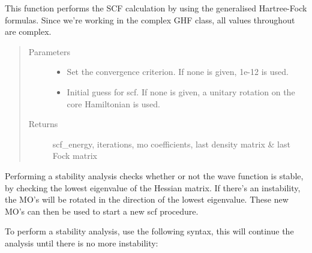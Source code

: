 \documentclass[letterpaper,10pt,english]{sphinxmanual}
\begin{document}
\begin{fulllineitems}
\begin{fulllineitems}
\label{\detokenize{Complex_GHF:ghf.complex_GHF.ComplexGHF.scf}}
This function performs the SCF calculation by using the generalised Hartree-Fock formulas. Since we’re working
in the complex GHF class, all values throughout are complex.
\begin{quote}\begin{description}
\item[{Parameters}] \leavevmode\begin{itemize}
\item {} 
 \textendash{} Set the convergence criterion. If none is given, 1e-12 is used.

\item {} 
 \textendash{} Initial guess for scf. If none is given, a unitary rotation on the core Hamiltonian is used.

\end{itemize}

\item[{Returns}] \leavevmode
scf\_energy, iterations, mo coefficients, last density matrix \& last Fock matrix

\end{description}\end{quote}

\end{fulllineitems}


\begin{fulllineitems}
\label{\detokenize{Complex_GHF:ghf.complex_GHF.ComplexGHF.stability}}
Performing a stability analysis checks whether or not the wave function is stable, by checking the lowest
eigenvalue of the Hessian matrix. If there’s an instability, the MO’s will be rotated in the direction
of the lowest eigenvalue. These new MO’s can then be used to start a new scf procedure.

To perform a stability analysis, use the following syntax, this will continue the analysis until there is
no more instability:


\end{fulllineitems}
\end{fulllineitems}
\end{document}
